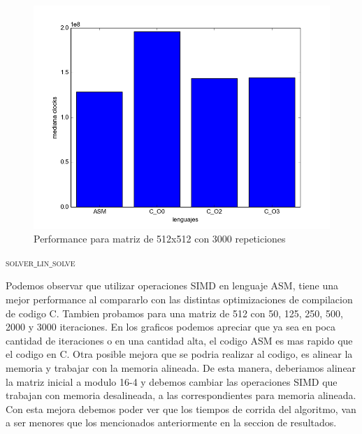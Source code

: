 \begin{figure}[h]
  \centering
  	\includegraphics[width=.6\linewidth]{Matriz_512_3000.png}
  	\caption{Performance para matriz de 512x512 con 3000 repeticiones}
  	\label{fig:M3000it}
\end{figure}

{\scshape\Large solver$\_$lin$\_$solve\par}

Podemos observar que utilizar operaciones SIMD en lenguaje ASM, tiene una mejor performance al compararlo con las distintas optimizaciones de compilacion de codigo C.
Tambien probamos para una matriz de 512 con 50, 125, 250, 500, 2000 y 3000 iteraciones.
En los graficos podemos apreciar que ya sea en poca cantidad de iteraciones o en una cantidad alta, el codigo ASM es mas rapido que el codigo en C.
Otra posible mejora que se podria realizar al codigo, es alinear la memoria y trabajar con la memoria alineada.
De esta manera, deberiamos alinear la matriz inicial a modulo 16-4 y debemos cambiar las operaciones SIMD que trabajan con memoria desalineada, a las correspondientes para memoria alineada.
Con esta mejora debemos poder ver que los tiempos de corrida del algoritmo, van a ser menores que los mencionados anteriormente en la seccion de resultados.





